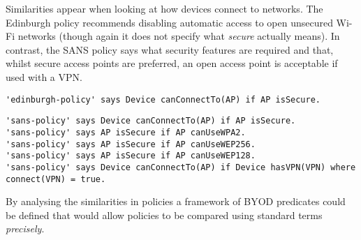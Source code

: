 \documentclass{easychair}
\begin{document}
Similarities appear when looking at how devices connect to networks.
The Edinburgh policy recommends disabling automatic access to open unsecured Wi-Fi networks (though again it does not specify what \emph{secure} actually means). 
In contrast, the SANS policy says what security features are required and that, whilst secure access points are preferred, an open access point is acceptable if used with a VPN.
\begin{lstlisting}[title={\footnotesize\textbf{Edinburgh}:~\itshape ``Control your devices connections by disabling automatic connection to open, unsecured Wi-Fi networks.''}]
'edinburgh-policy' says Device canConnectTo(AP) if AP isSecure.
\end{lstlisting}
\begin{lstlisting}[title={\footnotesize\textbf{SANS}:~\itshape ``If mobile workers do require connectivity through public, open, or untrusted WLAN, then users MUST use WLANs using, if available and in this order: WPA(2) encryption, WEP 256 bits (or 128 bits), or finally open networks if nothing else is available. Users connected to data networks in an open environment MUST use a VPN connection.''}]
'sans-policy' says Device canConnectTo(AP) if AP isSecure.
'sans-policy' says AP isSecure if AP canUseWPA2.
'sans-policy' says AP isSecure if AP canUseWEP256.
'sans-policy' says AP isSecure if AP canUseWEP128.
'sans-policy' says Device canConnectTo(AP) if Device hasVPN(VPN) where connect(VPN) = true.
\end{lstlisting}
By analysing the similarities in policies a framework of BYOD predicates could be defined that would allow policies to be compared using standard terms \emph{precisely}.
\end{document}
